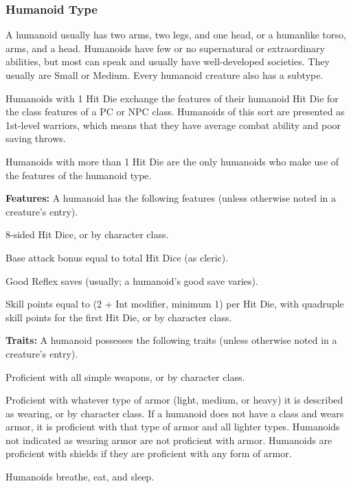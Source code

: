\subsubsection{Humanoid Type}
A humanoid usually has two arms, two legs, and one head, or a humanlike torso, arms, and a head. Humanoids have few or no supernatural or extraordinary abilities, but most can speak and usually have well-developed societies. They usually are Small or Medium. Every humanoid creature also has a subtype.

Humanoids with 1 Hit Die exchange the features of their humanoid Hit Die for the class features of a PC or NPC class. Humanoids of this sort are presented as 1st-level warriors, which means that they have average combat ability and poor saving throws.

Humanoids with more than 1 Hit Die are the only humanoids who make use of the features of the humanoid type.

\textbf{Features:} A humanoid has the following features (unless otherwise noted in a creature's entry).
\begin{itemize*}
\item 8-sided Hit Dice, or by character class.
\item Base attack bonus equal to \threequarters total Hit Dice (as cleric).
\item Good Reflex saves (usually; a humanoid's good save varies).
\item Skill points equal to (2 + Int modifier, minimum 1) per Hit Die, with quadruple skill points for the first Hit Die, or by character class.
\end{itemize*}

\textbf{Traits:} A humanoid possesses the following traits (unless otherwise noted in a creature's entry).
\begin{itemize*}
\item Proficient with all simple weapons, or by character class.
\item Proficient with whatever type of armor (light, medium, or heavy) it is described as wearing, or by character class. If a humanoid does not have a class and wears armor, it is proficient with that type of armor and all lighter types. Humanoids not indicated as wearing armor are not proficient with armor. Humanoids are proficient with shields if they are proficient with any form of armor.
\item Humanoids breathe, eat, and sleep.
\end{itemize*}

